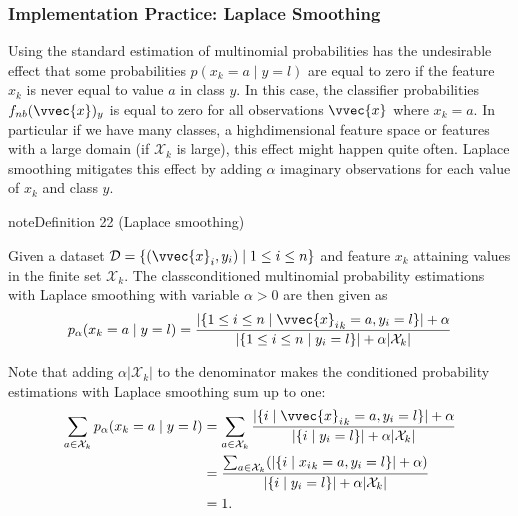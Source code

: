 \documentclass[letterpaper,10pt,english]{jupyterBook}
\begin{document}
\subsubsection{Implementation Practice: Laplace Smoothing}
\label{\detokenize{classification_naive_bayes:implementation-practice-laplace-smoothing}}
\sphinxAtStartPar
Using the standard estimation of multinomial probabilities has the undesirable effect that some probabilities \(p(x_k = a\mid y=l)\) are equal to zero if the feature \(x_k\) is never equal to value \(a\) in class \(y\). In this case, the classifier probabilities \(f_{nb}(\vvec{x})_y\) is equal to zero for all observations \(\vvec{x}\) where \(x_k=a\). In particular if we have many classes, a high\sphinxhyphen{}dimensional feature space or features with a large domain (if \(\mathcal{X}_k\) is large), this effect might happen quite often. Laplace smoothing mitigates this effect by adding \(\alpha\) imaginary observations for each value of \(x_k\) and class \(y\).
\label{classification_naive_bayes:definition-4}
\begin{sphinxadmonition}{note}{Definition 22 (Laplace smoothing)}



\sphinxAtStartPar
Given a dataset \(\mathcal{D}=\{(\vvec{x}_i,y_i)\mid 1\leq i\leq n\}\) and feature \(x_k\) attaining values in the finite set \(\mathcal{X}_k\). The class\sphinxhyphen{}conditioned multinomial probability estimations with Laplace smoothing with variable \(\alpha> 0\) are then given as
\begin{equation}\label{equation:classification_naive_bayes:freq_approx3}
\begin{split}p_\alpha(x_{k} =a\mid y=l) = \frac{\lvert\{ 1\leq i \leq n\mid {\vvec{x}_i}_k = a, y_i=l \}\rvert+\alpha}{\lvert\{1\leq i \leq n\mid y_i = l\}\rvert+\alpha \lvert\mathcal{X}_k\rvert}\end{split}
\end{equation}\end{sphinxadmonition}

\sphinxAtStartPar
Note that adding \(\alpha \lvert\mathcal{X}_k\rvert\) to the denominator makes the conditioned probability estimations with Laplace smoothing sum up to one:
\begin{align*}
\sum_{a\in \mathcal{X}_k} p_\alpha(x_{k} =a\mid y=l) 
& = \sum_{a\in \mathcal{X}_k} \frac{\lvert\{ i\mid {\vvec{x}_i}_k = a, y_i=l \}\rvert+\alpha}{\lvert\{i\mid y_i = l\}\rvert+\alpha \lvert\mathcal{X}_k\rvert}\\
& =  \frac{\sum_{a\in \mathcal{X}_k}( \lvert\{ i\mid {x_i}_k = a, y_i=l \}\rvert+\alpha)}{\lvert\{i\mid y_i = l\}\rvert+\alpha \lvert\mathcal{X}_k\rvert}\\
&= 1.
\end{align*}
\end{document}
